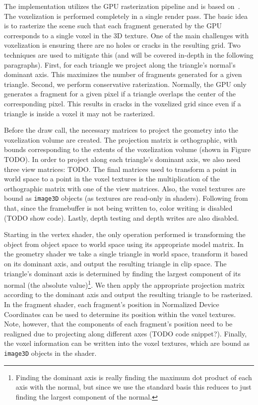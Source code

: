 The implementation utilizes the GPU rasterization pipeline and is based on~\cite{crassin12}. The voxelization is performed completely in a single render pass. The basic idea is to rasterize the scene such that each fragment generated by the GPU corresponds to a single voxel in the 3D texture.
One of the main challenges with voxelization is ensuring there are no holes or cracks in the resulting grid. Two techniques are used to mitigate this (and will be covered in-depth in the following paragraphs). First, for each triangle we project along the triangle's normal's dominant axis. This maximizes the number of fragments generated for a given triangle. Second, we perform conservative raterization. Normally, the GPU only generates a fragment for a given pixel if a triangle overlaps the center of the corresponding pixel. This results in cracks in the voxelized grid since even if a triangle is inside a voxel it may not be rasterized.

Before the draw call, the necessary matrices to project the geometry into the voxelization volume are created. The projection matrix is orthographic, with bounds corresponding to the extents of the voxelization volume (shown in Figure TODO). In order to project along each triangle's dominant axis, we also need three view matrices: TODO. The final matrices used to transform a point in world space to a point in the voxel textures is the multiplication of the orthographic matrix with one of the view matrices. Also, the voxel textures are bound as \texttt{image3D} objects (as textures are read-only in shaders). Following from that, since the framebuffer is not being written to, color writing is disabled (TODO show code). Lastly, depth testing and depth writes are also disabled.

Starting in the vertex shader, the only operation performed is transforming the object from object space to world space using its appropriate model matrix. In the geometry shader we take a single triangle in world space, transform it based on its dominant axis, and output the resulting triangle in clip space. The triangle's dominant axis is determined by finding the largest component of its normal (the absolute value)\footnote{Finding the dominant axis is really finding the maximum dot product of each axis with the normal, but since we use the standard basis this reduces to just finding the largest component of the normal.}. We then apply the appropriate projection matrix according to the dominant axis and output the resulting triangle to be rasterized. In the fragment shader, each fragment's position in Normalized Device Coordinates can be used to determine its position within the voxel textures. Note, however, that the components of each fragment's position need to be realigned due to projecting along different axes (TODO code snippet?). Finally, the voxel information can be written into the voxel textures, which are bound as \texttt{image3D} objects in the shader.

